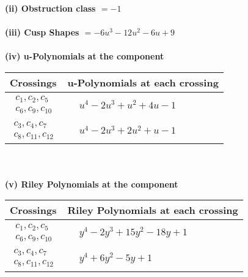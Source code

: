 \documentclass[1p]{elsarticle_modified}
\theoremstyle{definition}
\begin{document}
\flushleft \textbf{(ii) Obstruction class $= -1$}\\~\\
\flushleft \textbf{(iii) Cusp Shapes $= -6 u^3-12 u^2-6 u+9$}\\~\\
\newpage\renewcommand{\arraystretch}{1}
\flushleft \textbf{(iv) u-Polynomials at the component}\newline \\
\begin{tabular}{m{50pt}|m{274pt}}
Crossings & \hspace{64pt}u-Polynomials at each crossing \\
\hline $$\begin{aligned}c_{1},c_{2},c_{5}\\c_{6},c_{9},c_{10}\end{aligned}$$&$\begin{aligned}
&u^4-2 u^3+u^2+4 u-1
\end{aligned}$\\
\hline $$\begin{aligned}c_{3},c_{4},c_{7}\\c_{8},c_{11},c_{12}\end{aligned}$$&$\begin{aligned}
&u^4-2 u^3+2 u^2+u-1
\end{aligned}$\\
\hline
\end{tabular}\\~\\
\newpage\renewcommand{\arraystretch}{1}
\flushleft \textbf{(v) Riley Polynomials at the component}\newline \\
\begin{tabular}{m{50pt}|m{274pt}}
Crossings & \hspace{64pt}Riley Polynomials at each crossing \\
\hline $$\begin{aligned}c_{1},c_{2},c_{5}\\c_{6},c_{9},c_{10}\end{aligned}$$&$\begin{aligned}
&y^4-2 y^3+15 y^2-18 y+1
\end{aligned}$\\
\hline $$\begin{aligned}c_{3},c_{4},c_{7}\\c_{8},c_{11},c_{12}\end{aligned}$$&$\begin{aligned}
&y^4+6 y^2-5 y+1
\end{aligned}$\\
\hline
\end{tabular}\\~\\
\end{document}
